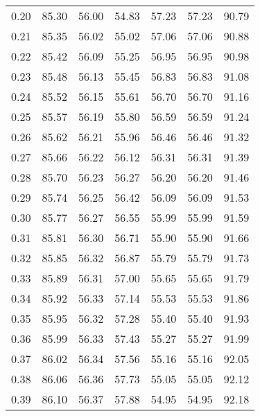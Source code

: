 \begin{tabular}{|c|c|c|c|c|c|c|}
      0.20 &     85.30 &     56.00 &      54.83 &   57.23 &      57.23 &         90.79 \\
      0.21 &     85.35 &     56.02 &      55.02 &   57.06 &      57.06 &         90.88 \\
      0.22 &     85.42 &     56.09 &      55.25 &   56.95 &      56.95 &         90.98 \\
      0.23 &     85.48 &     56.13 &      55.45 &   56.83 &      56.83 &         91.08 \\
      0.24 &     85.52 &     56.15 &      55.61 &   56.70 &      56.70 &         91.16 \\
      0.25 &     85.57 &     56.19 &      55.80 &   56.59 &      56.59 &         91.24 \\
      0.26 &     85.62 &     56.21 &      55.96 &   56.46 &      56.46 &         91.32 \\
      0.27 &     85.66 &     56.22 &      56.12 &   56.31 &      56.31 &         91.39 \\
      0.28 &     85.70 &     56.23 &      56.27 &   56.20 &      56.20 &         91.46 \\
      0.29 &     85.74 &     56.25 &      56.42 &   56.09 &      56.09 &         91.53 \\
      0.30 &     85.77 &     56.27 &      56.55 &   55.99 &      55.99 &         91.59 \\
      0.31 &     85.81 &     56.30 &      56.71 &   55.90 &      55.90 &         91.66 \\
      0.32 &     85.85 &     56.32 &      56.87 &   55.79 &      55.79 &         91.73 \\
      0.33 &     85.89 &     56.31 &      57.00 &   55.65 &      55.65 &         91.79 \\
      0.34 &     85.92 &     56.33 &      57.14 &   55.53 &      55.53 &         91.86 \\
      0.35 &     85.95 &     56.32 &      57.28 &   55.40 &      55.40 &         91.93 \\
      0.36 &     85.99 &     56.33 &      57.43 &   55.27 &      55.27 &         91.99 \\
      0.37 &     86.02 &     56.34 &      57.56 &   55.16 &      55.16 &         92.05 \\
      0.38 &     86.06 &     56.36 &      57.73 &   55.05 &      55.05 &         92.12 \\
      0.39 &     86.10 &     56.37 &      57.88 &   54.95 &      54.95 &         92.18 \\

\end{tabular}

